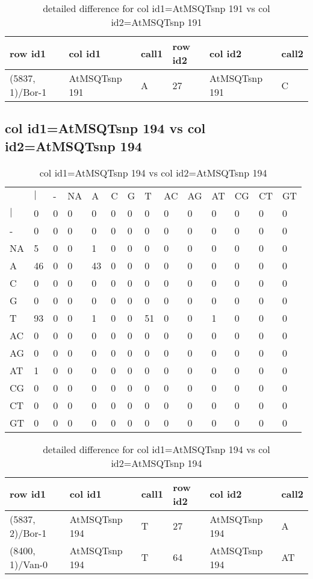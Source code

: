 \begin{center}
\begin{longtable}{|l|l|l|l|l|l|}
\caption{detailed difference for col id1=AtMSQTsnp 191 vs col id2=AtMSQTsnp 191} \label{table_dm563}\\
\hline
row id1&col id1&call1&row id2&col id2&call2\\
\hline
(5837, 1)/Bor-1&AtMSQTsnp 191&A&27&AtMSQTsnp 191&C\\
\hline
\end{longtable}
\end{center}

\subsection{col id1=AtMSQTsnp 194 vs col id2=AtMSQTsnp 194}
\begin{center}
\begin{longtable}{|l|l|l|l|l|l|l|l|l|l|l|l|l|l|}
\caption{col id1=AtMSQTsnp 194 vs col id2=AtMSQTsnp 194} \label{table_dm564}\\
\hline
\\
\hline
&$|$&-&NA&A&C&G&T&AC&AG&AT&CG&CT&GT\\
$|$&0&0&0&0&0&0&0&0&0&0&0&0&0\\
-&0&0&0&0&0&0&0&0&0&0&0&0&0\\
NA&5&0&0&1&0&0&0&0&0&0&0&0&0\\
A&46&0&0&43&0&0&0&0&0&0&0&0&0\\
C&0&0&0&0&0&0&0&0&0&0&0&0&0\\
G&0&0&0&0&0&0&0&0&0&0&0&0&0\\
T&93&0&0&1&0&0&51&0&0&1&0&0&0\\
AC&0&0&0&0&0&0&0&0&0&0&0&0&0\\
AG&0&0&0&0&0&0&0&0&0&0&0&0&0\\
AT&1&0&0&0&0&0&0&0&0&0&0&0&0\\
CG&0&0&0&0&0&0&0&0&0&0&0&0&0\\
CT&0&0&0&0&0&0&0&0&0&0&0&0&0\\
GT&0&0&0&0&0&0&0&0&0&0&0&0&0\\
\hline
\end{longtable}
\end{center}

\begin{center}
\begin{longtable}{|l|l|l|l|l|l|}
\caption{detailed difference for col id1=AtMSQTsnp 194 vs col id2=AtMSQTsnp 194} \label{table_dm565}\\
\hline
row id1&col id1&call1&row id2&col id2&call2\\
\hline
(5837, 2)/Bor-1&AtMSQTsnp 194&T&27&AtMSQTsnp 194&A\\
(8400, 1)/Van-0&AtMSQTsnp 194&T&64&AtMSQTsnp 194&AT\\
\hline
\end{longtable}
\end{center}

